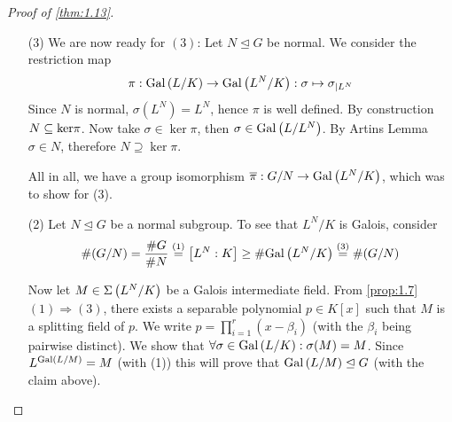 \documentclass[twoside = false,	%
		headsepline,		%
		parskip = true,
		]{scrbook}						%
\begin{document}
\begin{proof}[Proof of \ref{thm:1.13}]
\begin{enumerate}
            \begin{claim*}{}
            $N\in\Gamma(G)$ is a normal subgroup if and only if $\sigma\round{L^N}=L^N\ \forall \sigma\in N$
            \end{claim*}
            \begin{proof}
            \underline{"$\Leftarrow$":}
                By plugging in the definitions we see, that $\sigma\round{L^N}=L^{\sigma N\sigma^{-1}}$
                \begin{align*}
                    \alpha\in L^{\sigma N \sigma^{-1}} &\Leftrightarrow \forall g\in N: \sigma g \sigma^{-1}(\alpha)=\alpha \\
                    &\Leftrightarrow \forall g\in N: g\sigma^{-1}(\alpha)=\sigma^{-1}(\alpha)\\
                    &\Leftrightarrow \sigma^{-1}(\alpha)\in L^N \\
                    &\Leftrightarrow \alpha\in \sigma\round{L^N}
                \end{align*}
                We have $\forall \sigma\in G: L^{\sigma N \sigma^{-1}}=L^N$. Artins Lemma then gives us $$\sigma N\sigma^{-1} = \Gal{L/L^{\sigma N \sigma\inv}} = \Gal{L/L^N} = N $$
                The other direction is clear.
            \end{proof}
            \item[(3)]    
            We are now ready for $(3)$: Let $N\trianglelefteq G$ be normal. We consider the restriction map
            $$\pi: \mathrm{Gal}\left( L/K\right) \to \mathrm{Gal}\left( L^N/K\right): \sigma \mapsto \sigma_{|L^N}$$
            Since $N$ is normal, $\sigma(L^N)=L^N$, hence $\pi$ is well defined. By construction $N\subseteq \mathrm{ker}\pi$. Now take $\sigma\in \ker\pi$, then $\sigma\in\mathrm{Gal}\left( L/L^N\right)$. By Artins Lemma $\sigma\in N$, therefore $N\supseteq \ker\pi$.
            
            All in all, we have a group isomorphism $\overline\pi:G/N\to \mathrm{Gal}\left( L^N/K\right)$, which was to show for (3).
            
            \item[(2)]
            Let $N\trianglelefteq G$ be a normal subgroup. To see that $L^N/K$ is Galois, consider
            $$\#(G/N)= \frac{\#G}{\#N}\overset{(1)}=\left[ L^N:K\right]\geq\#\mathrm{Gal}\left( L^N/K\right)\overset{(3)} = \#(G/N)$$
            
            Now let $M\in\Sigma\left( L^N/K\right)$ be a Galois intermediate field. From \ref{prop:1.7} $(1)\Rightarrow(3)$, there exists a separable polynomial $p\in K[x]$ such that $M$ is a splitting field of $p$. We write $p=\prod_{i=1}^r(x-\beta_i)$ (with the $\beta_i$ being pairwise distinct). We show that $\forall\sigma \in\mathrm{Gal}\left( L/K\right): \sigma(M)=M$. Since $L^{\mathrm{Gal}\left( L/M\right)}=M$ (with (1)) this will prove that $\mathrm{Gal}\left( L/M\right) \trianglelefteq G$ (with the claim above).
            

\end{enumerate}
\end{proof}
\end{document}
